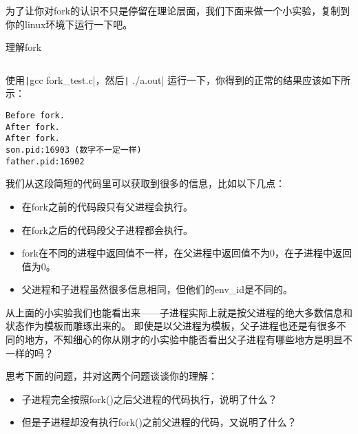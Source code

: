 为了让你对fork的认识不只是停留在理论层面，我们下面来做一个小实验，复制到你的linux环境下运行一下吧。
\begin{codeBoxWithCaption}{理解fork\label{code:fork_test.c}}
  \inputminted[linenos]{c}{codes/fork_test.c}
\end{codeBoxWithCaption}

使用\texttt|gcc fork_test.c|，然后\texttt| ./a.out| 运行一下，你得到的正常的结果应该如下所示：
\begin{verbatim}
Before fork.
After fork.
After fork.
son.pid:16903 (数字不一定一样)
father.pid:16902
\end{verbatim}

我们从这段简短的代码里可以获取到很多的信息，比如以下几点：
\begin{itemize}
 \item 在fork之前的代码段只有父进程会执行。
 \item 在fork之后的代码段父子进程都会执行\label{fork与子进程}。
 \item fork在不同的进程中返回值不一样，在父进程中返回值不为0，在子进程中返回值为0。
 \item 父进程和子进程虽然很多信息相同，但他们的env\_id是不同的。
\end{itemize}

从上面的小实验我们也能看出来——子进程实际上就是按父进程的绝大多数信息和状态作为模板而雕琢出来的。
即使是以父进程为模板，父子进程也还是有很多不同的地方，不知细心的你从刚才的小实验中能否看出父子进程有哪些地方是明显不一样的吗？

\begin{thinking}
 思考下面的问题，并对这两个问题谈谈你的理解：
  \begin{itemize}
   \item 子进程完全按照fork()之后父进程的代码执行，说明了什么？
   \item 但是子进程却没有执行fork()之前父进程的代码，又说明了什么？
  \end{itemize}
\end{thinking}



